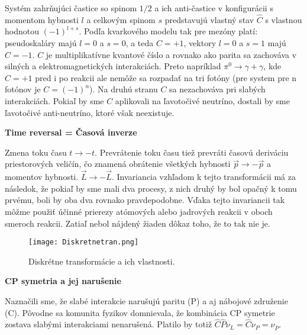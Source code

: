 \documentclass[../../main.tex]{subfiles}
\begin{document}
Systém zahrňujúci častice so spinom $1/2$ a ich anti-častice v konfigurácii s momentom hybnosti $l$ a celkovým spinom $s$ predstavujú vlastný stav $\hat{C}$ s vlastnou hodnotou $(-1)^{l+s}$. Podľa kvarkového modelu tak pre mezóny platí: pseudoskaláry majú $l=0$ a $s=0$, a teda $C=+1$, vektory $l=0$ a $s=1$ majú $C=-1$. $C$ je multiplikatívne kvantové číslo a rovnako ako parita sa zachováva v silných a elektromagnetických interakciách. Preto napríklad $\pi^0 \rightarrow \gamma + \gamma$, kde $C=+1$ pred i po reakcii ale nemôže sa rozpadať na tri fotóny (pre system pre n fotónov je $C=(-1)^n$). Na druhú stranu $C$ sa nezachováva pri slabých interakciách. Pokiaľ by sme $C$ aplikovali na ľavotočivé neutríno, dostali by sme ľavotočivé anti-neutríno, ktoré však neexistuje.\newline

\textbf{Time reversal = Časová inverze}\par
Zmena toku času $t\rightarrow -t$. Prevrátenie toku času tiež prevráti časovú deriváciu priestorových veličín, čo znamená obrátenie všetkých hybnosti $\vec{p} \rightarrow -\vec{p}$ a momentov hybnosti. $\vec{L} \rightarrow -\vec{L}$. Invariancia vzhľadom k tejto transformácii má za následok, že pokiaľ by sme mali dva procesy, z nich druhý by bol opačný k tomu prvému, boli by oba dva rovnako pravdepodobne. Vďaka tejto invariancii tak môžme použiť účinné prierezy atómových alebo jadrových reakcii v oboch smeroch reakcii. Zatiaľ nebol nájdený žiaden dôkaz toho, že to tak nie je. 
\begin{figure}[!h]
\centering
\texttt{[image: Diskretnetran.png]}
\caption{Diskrétne transformácie a ich vlastnosti.}
\label{sf1:fig:Diskretnetran}
\end{figure}
\newline
\textbf{CP symetria a jej narušenie}\par
Naznačili sme, že slabé interakcie narušujú paritu (P) a aj nábojové združenie (C). Pôvodne sa komunita fyzikov domnievala, že kombinácia CP symetrie zostava slabými interakciami nenarušená. Platilo by totiž $\hat{C}\hat{P}\nu_{L}=\hat{C}\nu_P=\nu_{\bar{P}}$.
\end{document}
